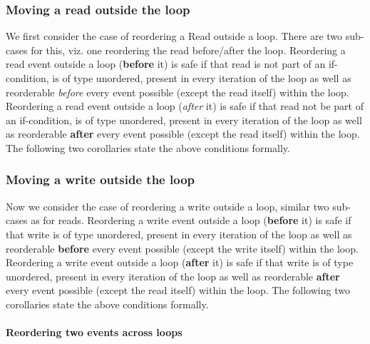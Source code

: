             \subsubsection{Moving a read outside the loop}
                We first consider the case of reordering a Read outside a loop. 
                There are two sub-cases for this, viz. one reordering the read before/after the loop.
                Reordering a read event outside a loop (\textbf{before} it) is safe if that read is not part of an if-condition, is of type unordered,  present in every iteration of the loop as well as reorderable \textit{before} every event possible (except the read itself) within the loop. 
                Reordering a read event outside a loop (\textit{after} it) is safe if that read not be part of an if-condition, is of type unordered, present in every iteration of the loop as well as reorderable \textbf{after} every event possible (except the read itself) within the loop. 
                The following two corollaries state the above conditions formally.

                            

            \subsubsection{Moving a write outside the loop}
                Now we consider the case of reordering a write outside a loop, similar two sub-cases as for reads.     
                Reordering a write event outside a loop (\textbf{before} it) is safe if that write is of type unordered, present in every iteration of the loop as well as reorderable \textbf{before} every event possible (except the write itself) within the loop. 
                Reordering a write event outside a loop (\textbf{after} it) is safe if that write is of type unordered, present in every iteration of the loop as well as reorderable \textbf{after} every event possible (except the read itself) within the loop.      
                The following two corollaries state the above conditions formally.

                   

            \paragraph{Reordering two events across loops} 
            
